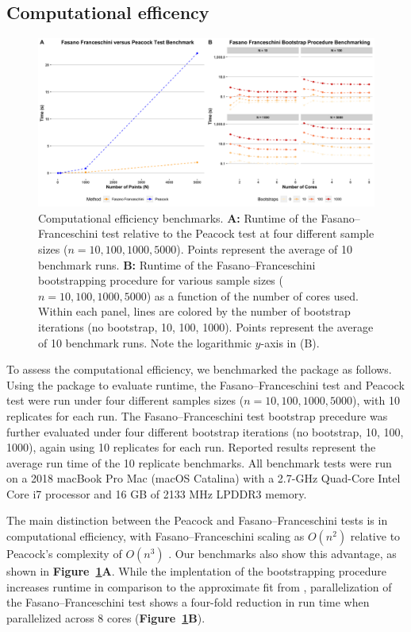 \documentclass[codesnippet]{jss}
\begin{document}
\subsection{Computational efficency}

\begin{figure}[hbt]
\centering
\includegraphics{benchmark}
\caption{\label{fig:bmark} Computational efficiency benchmarks.
\textbf{A:} Runtime of the
Fasano--Franceschini test relative to the Peacock test at four different sample sizes
($n=10, 100, 1000, 5000$).  Points represent the
average of 10 benchmark runs. \textbf{B:} Runtime of the
Fasano--Franceschini bootstrapping procedure for various sample sizes
($n= 10, 100, 1000, 5000$) as a function of the number of cores used. Within each panel,
lines are colored by the number of bootstrap iterations (no bootstrap, 10, 100,
1000). Points represent the average of 10 benchmark runs. Note the logarithmic $y$-axis
in (B).}
\end{figure}

To assess the computational efficiency, we benchmarked the package as follows.
Using the  package to evaluate runtime, the Fasano--Franceschini
test and Peacock test were run under four different samples sizes
($n=10, 100, 1000, 5000$), with 10 replicates for each run. The
Fasano--Franceschini test bootstrap precedure was further evaluated
under four different bootstrap iterations (no bootstrap, 10, 100, 1000),
again using 10 replicates for each run. Reported results represent the
average run time of the 10 replicate benchmarks. All benchmark tests were run on a 2018 macBook
Pro Mac (macOS Catalina) with a 2.7-GHz Quad-Core Intel Core i7 processor and 16 GB of 2133 MHz LPDDR3 memory.

The main distinction between the Peacock and Fasano--Franceschini
tests is in computational efficiency, with  Fasano--Franceschini
scaling as $O(n^2)$ relative to Peacock's complexity of  $O(n^3)$
\citep{Lopes2007}.  Our benchmarks also show this advantage, as shown
in \textbf{Figure~\ref{fig:bmark}A}.  While the implentation of the
bootstrapping procedure increases runtime in comparison to the
approximate fit from  \citet{numericalRecipes}, parallelization of the
Fasano--Franceschini test shows a four-fold reduction in run time when
parallelized across 8 cores (\textbf{Figure~\ref{fig:bmark}B}).
\end{document}
